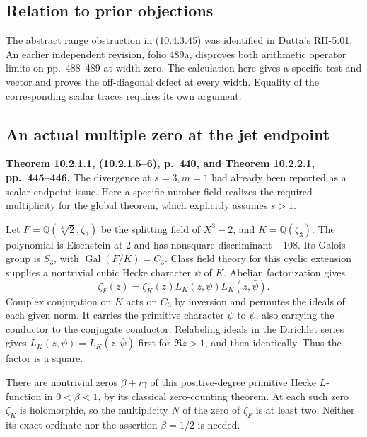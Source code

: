 \documentclass[11pt,reqno]{amsart}
\numberwithin{equation}{section}
\newcommand{\Q}{\mathbb Q}\newcommand{\R}{\mathbb R}\newcommand{\C}{\mathbb C}\newcommand{\Z}{\mathbb Z}
\begin{document}
\subsection{Relation to prior objections}
The abstract range obstruction in (10.4.3.45) was identified in \href{https://github.com/SanchayanDutta/masullo-rh/blob/5e539d64bddc9420c099956521a02531e306d3de/bugs/RH-5.01-projection-order-and-spectral-range.md}{Dutta's RH-5.01}. An \href{https://github.com/Titulus233/The-Music-of-the-Primes-Revise/blob/4a9ad5765d4a2dfb237f874695ee4f4a07817867/src/the-music-of-the-primes-revised.tex}{earlier independent revision, folio 489a}, disproves both arithmetic operator limits on pp.~488--489 at width zero. The calculation here gives a specific test and vector and proves the off-diagonal defect at every width. Equality of the corresponding scalar traces requires its own argument.

\subsection{An actual multiple zero at the jet endpoint}
\textbf{Theorem 10.2.1.1, (10.2.1.5--6), p.~440, and Theorem 10.2.2.1, pp.~445--446.}
The divergence at \(s=3,m=1\) had already been reported as a scalar endpoint issue. Here a specific number field realizes the required multiplicity for the global theorem, which explicitly assumes \(s>1\).

Let \(F=\Q(\sqrt[3]{2},\zeta_3)\) be the splitting field of \(X^3-2\), and \(K=\Q(\zeta_3)\). The polynomial is Eisenstein at 2 and has nonsquare discriminant \(-108\). Its Galois group is \(S_3\), with \(\operatorname{Gal}(F/K)=C_3\). Class field theory for this cyclic extension supplies a nontrivial cubic Hecke character \(\psi\) of \(K\). Abelian factorization gives
\[
                   \zeta_F(z)=\zeta_K(z)L_K(z,\psi)L_K(z,\bar\psi).
\]
Complex conjugation on \(K\) acts on \(C_3\) by inversion and permutes the ideals of each given norm. It carries the primitive character \(\psi\) to \(\bar\psi\), also carrying the conductor to the conjugate conductor. Relabeling ideals in the Dirichlet series gives \(L_K(z,\psi)=L_K(z,\bar\psi)\) first for \(\Re z>1\), and then identically. Thus the factor is a square.

There are nontrivial zeros \(\beta+i\gamma\) of this positive-degree primitive Hecke \(L\)-function in \(0<\beta<1\), by its classical zero-counting theorem. At each such zero \(\zeta_K\) is holomorphic, so the multiplicity \(N\) of the zero of \(\zeta_F\) is at least two. Neither its exact ordinate nor the assertion \(\beta=1/2\) is needed.
\end{document}
